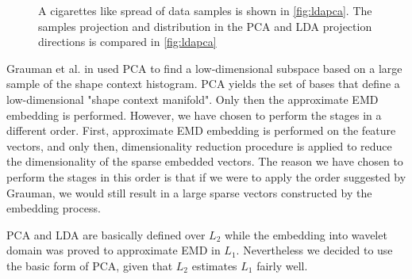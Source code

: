 \begin{figure}
	\centering
    \caption{A cigarettes like spread of data samples is shown in \ref{fig:ldapca}. 
    The samples projection and distribution in the PCA and LDA projection directions is compared in \ref{fig:ldapca}}
   \label{fig:cigarettes_data}
\end{figure}


\iftoggle{edit-mode}{\hspace{0pt}\marginpar{When to perform the DR?}}{}
Grauman et al. in \cite{grauman2004fast} used PCA to find a low-dimensional subspace based on a large sample of the shape context histogram. 
PCA yields the set of bases that define a low-dimensional "shape context manifold". 
Only then the approximate EMD embedding is performed. 
However, we have chosen to perform the stages in a different order. 
First, approximate EMD embedding is performed on the feature vectors, and only then, dimensionality reduction procedure is applied to reduce the dimensionality of the sparse embedded vectors. 
The reason we have chosen to perform the stages in this order is that if we were to apply the order suggested by Grauman, we would still result in a large sparse vectors constructed by the embedding process.
  
\iftoggle{edit-mode}{\hspace{0pt}\marginpar{Usage of PCA in the $L_1$ space.}}{}
PCA and LDA are basically defined over $L_2$ while the embedding into wavelet domain was proved to approximate EMD in $L_1$. 
Nevertheless we decided to use the basic form of PCA, given that $L_2$ estimates $L_1$ fairly well.

